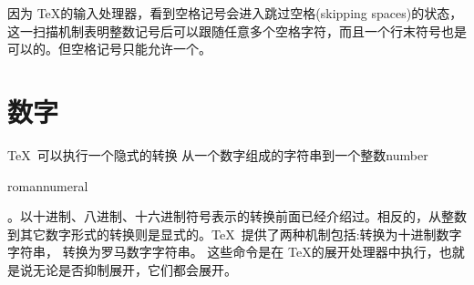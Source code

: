 \documentclass{book}
\begin{document}


因为 \TeX 的输入处理器，看到空格记号会进入跳过空格(skipping spaces)的状态，这一扫描机制表明整数记号后可以跟随任意多个空格字符，而且一个行末符号也是可以的。但空格记号只能允许一个。

\section{数字}


\TeX\ 可以执行一个隐式的转换 从一个数字组成的字符串到一个整数\cstoidx number\par\cstoidx romannumeral\par。以十进制、八进制、十六进制符号表示的转换前面已经介绍过。相反的，从整数到其它数字形式的转换则是显式的。\TeX\ 提供了两种机制包括:转换为十进制数字字符串，
转换为罗马数字字符串。
这些命令是在 \TeX 的展开处理器中执行，也就是说无论是否抑制展开，它们都会展开。


\end{document}
